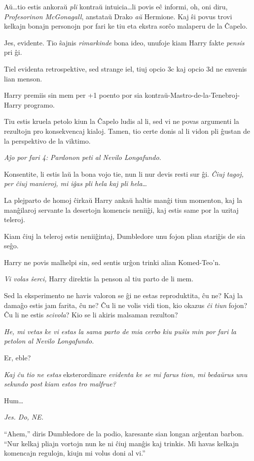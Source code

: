 Aŭ\ldots tio estis ankoraŭ \emph{pli} kontraŭ intuicia\ldots li povis
eĉ informi, oh, oni diru, \emph{Profesorinon McGonagall}, anstataŭ
Drako \emph{aŭ} Hermione. Kaj ŝi povus trovi kelkajn bonajn personojn por
fari ke tiu eta ekstra sorĉo malaperu de la Ĉapelo.

Jes, evidente. Tio ŝajnis \emph{rimarkinde} bona ideo, unufoje kiam
Harry fakte \emph{pensis} pri ĝi.

Tiel evidenta retrospektive, sed strange iel, tiuj opcio 3c kaj opcio
3d ne envenis lian menson.

Harry premiis sin mem per +1 poento por sia
kontraŭ-Mastro-de-la-Tenebroj-Harry programo.

Tiu estis kruela petolo kiun la Ĉapelo ludis al li, sed vi ne povas
argumenti la rezultojn pro konsekvencaj kialoj. Tamen, tio certe donis
al li vidon pli ĝustan de la perspektivo de la viktimo.

\emph{Aĵo por fari 4: Pardonon peti al Nevilo Longafundo.}

Konsentite, li estis laŭ la bona vojo tie, nun li nur devis resti sur
ĝi. \emph{Ĉiuj tagoj, per ĉiuj manieroj, mi iĝas pli hela kaj pli
  hela\ldots}

La plejparto de homoj ĉirkaŭ Harry ankaŭ haltis manĝi tiun momenton,
kaj la manĝilaroj servante la desertojn komencis neniiĝi, kaj estis
same por la uzitaj teleroj.

Kiam ĉiuj la teleroj estis neniiĝintaj, Dumbledore unu fojon plian
stariĝis de sia seĝo.

Harry ne povis malhelpi sin, sed sentis urĝon trinki alian
Komed-Teo'n.

\emph{Vi \emph{volas} ŝerci,} Harry direktis la penson al tiu parto de li mem.

Sed la eksperimento ne havis valoron se ĝi ne estas reproduktita, ĉu
ne?  Kaj la damaĝo estis jam farita, ĉu ne? Ĉu li ne volis vidi tion,
kio okazus \emph{ĉi tiun} fojon? Ĉu li ne estis \emph{scivola}? Kio se
li akiris malsaman rezulton?

\emph{He, mi vetas ke vi estas la sama parto de mia cerbo kiu puŝis
  min por fari la petolon al Nevilo Longafundo.}

Er, eble?

\emph{Kaj ĉu tio ne estas} eksterordinare \emph{evidenta ke se mi
  farus tion, mi bedaŭrus unu sekundo post kiam estos tro malfrue?}

Hum\ldots

\emph{Jes. Do, NE.}

``Ahem,'' diris Dumbledore de la podio, karesante sian longan arĝentan
barbon. ``Nur kelkaj pliajn vortojn nun ke ni ĉiuj manĝis kaj
trinkis. Mi havas kelkajn komencajn regulojn, kiujn mi volus doni al
vi.''

